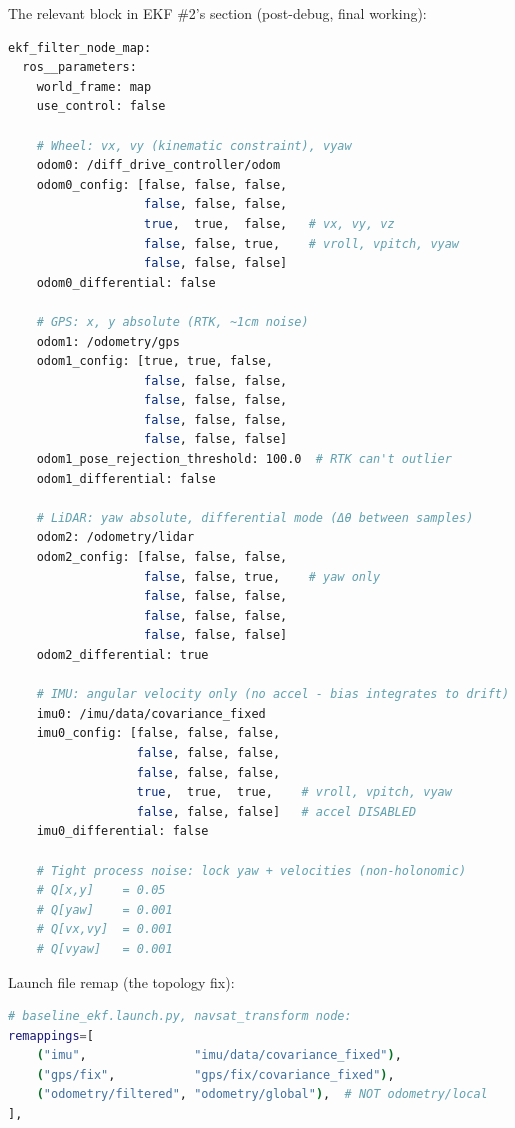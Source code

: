 \documentclass[11pt,a4paper]{article}
\begin{document}
The relevant block in EKF \#2's section (post-debug, final working):
\begin{lstlisting}[language=bash]
ekf_filter_node_map:
  ros__parameters:
    world_frame: map
    use_control: false

    # Wheel: vx, vy (kinematic constraint), vyaw
    odom0: /diff_drive_controller/odom
    odom0_config: [false, false, false,
                   false, false, false,
                   true,  true,  false,   # vx, vy, vz
                   false, false, true,    # vroll, vpitch, vyaw
                   false, false, false]
    odom0_differential: false

    # GPS: x, y absolute (RTK, ~1cm noise)
    odom1: /odometry/gps
    odom1_config: [true, true, false,
                   false, false, false,
                   false, false, false,
                   false, false, false,
                   false, false, false]
    odom1_pose_rejection_threshold: 100.0  # RTK can't outlier
    odom1_differential: false

    # LiDAR: yaw absolute, differential mode (Δθ between samples)
    odom2: /odometry/lidar
    odom2_config: [false, false, false,
                   false, false, true,    # yaw only
                   false, false, false,
                   false, false, false,
                   false, false, false]
    odom2_differential: true

    # IMU: angular velocity only (no accel - bias integrates to drift)
    imu0: /imu/data/covariance_fixed
    imu0_config: [false, false, false,
                  false, false, false,
                  false, false, false,
                  true,  true,  true,    # vroll, vpitch, vyaw
                  false, false, false]   # accel DISABLED
    imu0_differential: false

    # Tight process noise: lock yaw + velocities (non-holonomic)
    # Q[x,y]    = 0.05
    # Q[yaw]    = 0.001
    # Q[vx,vy]  = 0.001
    # Q[vyaw]   = 0.001
\end{lstlisting}

Launch file remap (the topology fix):
\begin{lstlisting}[language=bash]
# baseline_ekf.launch.py, navsat_transform node:
remappings=[
    ("imu",               "imu/data/covariance_fixed"),
    ("gps/fix",           "gps/fix/covariance_fixed"),
    ("odometry/filtered", "odometry/global"),  # NOT odometry/local
],
\end{lstlisting}

\end{document}
